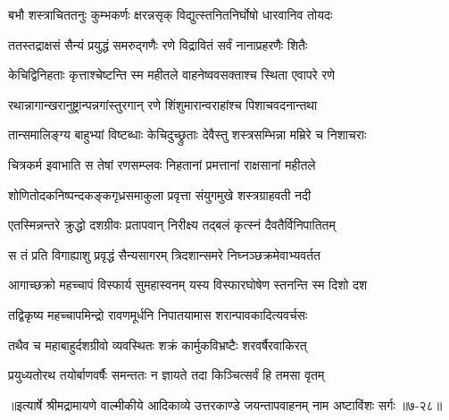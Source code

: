 \twolineshloka
{बभौ शस्त्राचिततनुः कुम्भकर्णः क्षरन्नसृक्}
{विद्युत्स्तनितनिर्घोषो धारवानिव तोयदः} %

\twolineshloka
{ततस्तद्राक्षसं सैन्यं प्रयुद्धं समरुद्गणैः}
{रणे विद्रावितं सर्वं नानाप्रहरणैः शितैः} %

\twolineshloka
{केचिद्विनिहताः कृत्ताश्चेष्टन्ति स्म महीतले}
{वाहनेष्ववसक्ताश्च स्थिता एवापरे रणे} %

\twolineshloka
{रथान्नागान्खरानुष्ट्रान्पन्नगांस्तुरगान् रणे}
{शिंशुमारान्वराहांश्च पिशाचवदनान्तथा} %

\twolineshloka
{तान्समालिङ्ग्य बाहुभ्यां विष्टब्धाः केचिदुच्छ्रुताः}
{देवैस्तु शस्त्रसम्भिन्ना मम्रिरे च निशाचराः} %

\twolineshloka
{चित्रकर्म इवाभाति स तेषां रणसम्प्लवः}
{निहतानां प्रमत्तानां राक्षसानां महीतले} %

\twolineshloka
{शोणितोदकनिष्पन्दकङ्कगृध्रसमाकुला}
{प्रवृत्ता संयुगमुखे शस्त्रग्राहवती नदी} %

\twolineshloka
{एतस्मिन्नन्तरे क्रुद्धो दशग्रीवः प्रतापवान्}
{निरीक्ष्य तद्बलं कृत्स्नं दैवतैर्विनिपातितम्} %

\twolineshloka
{स तं प्रति विगाह्याशु प्रवृद्धं सैन्यसागरम्}
{त्रिदशान्समरे निघ्नञ्छक्रमेवाभ्यवर्तत} %

\twolineshloka
{आगाच्छक्रो महच्चापं विस्फार्य सुमहास्वनम्}
{यस्य विस्फारघोषेण स्तनन्ति स्म दिशो दश} %

\twolineshloka
{तद्विकृष्य महच्चापमिन्द्रो रावणमूर्धनि}
{निपातयामास शरान्पावकादित्यवर्चसः} %

\twolineshloka
{तथैव च महाबाहुर्दशग्रीवो व्यवस्थितः}
{शक्रं कार्मुकविभ्रष्टैः शरवर्षैरवाकिरत्} %

\twolineshloka
{प्रयुध्यतोरथ तयोर्बाणवर्षैः समन्ततः}
{न ज्ञायते तदा किञ्चित्सर्वं हि तमसा वृतम्} %


॥इत्यार्षे श्रीमद्रामायणे वाल्मीकीये आदिकाव्ये उत्तरकाण्डे जयन्तापवाहनम् नाम अष्टाविंशः सर्गः ॥७-२८॥
